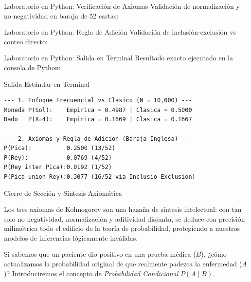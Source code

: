 \documentclass[10pt,aspectratio=169]{beamer}
\begin{document}
\begin{frame}[fragile]{Laboratorio en Python: Verificación de Axiomas}
  Validación de normalización y no negatividad en baraja de 52 cartas:
  \vspace{0.2em}
  {
  }
\end{frame}

\begin{frame}[fragile]{Laboratorio en Python: Regla de Adición}
  Validación de inclusión-exclusión vs conteo directo:
  \vspace{0.2em}
  {
  }
\end{frame}

\begin{frame}[fragile]{Laboratorio en Python: Salida en Terminal}
  Resultado exacto ejecutado en la consola de Python:
  \vspace{0.2em}
  \begin{block}{Salida Estándar en Terminal}
    \fontsize{6.5pt}{7.5pt}\selectfont
    \begin{verbatim}
--- 1. Enfoque Frecuencial vs Clasico (N = 10,000) ---
Moneda P(Sol):    Empirica = 0.4987 | Clasica = 0.5000
Dado   P(X=4):    Empirica = 0.1669 | Clasica = 0.1667

--- 2. Axiomas y Regla de Adicion (Baraja Inglesa) ---
P(Pica):          0.2500 (13/52)
P(Rey):           0.0769 (4/52)
P(Rey inter Pica):0.0192 (1/52)
P(Pica union Rey):0.3077 (16/52 via Inclusio-Exclusion)
    \end{verbatim}
  \end{block}
\end{frame}

\begin{frame}{Cierre de Sección y Síntesis Axiomática}
  \begin{reflexion}
    Los tres axiomas de Kolmogorov son una hazaña de síntesis intelectual: con tan solo no negatividad, normalización y aditividad disjunta, se deduce con precisión milimétrica todo el edificio de la teoría de probabilidad, protegiendo a nuestros modelos de inferencias lógicamente inválidas.
  \end{reflexion}

  \vspace{0.5em}
  \pause
  \begin{retoclase}
    Si sabemos que un paciente dio positivo en una prueba médica ($B$), ¿cómo actualizamos la probabilidad original de que realmente padezca la enfermedad ($A$)? Introduciremos el concepto de \emph{Probabilidad Condicional} $P(A \mid B)$.
  \end{retoclase}
\end{frame}
\end{document}
